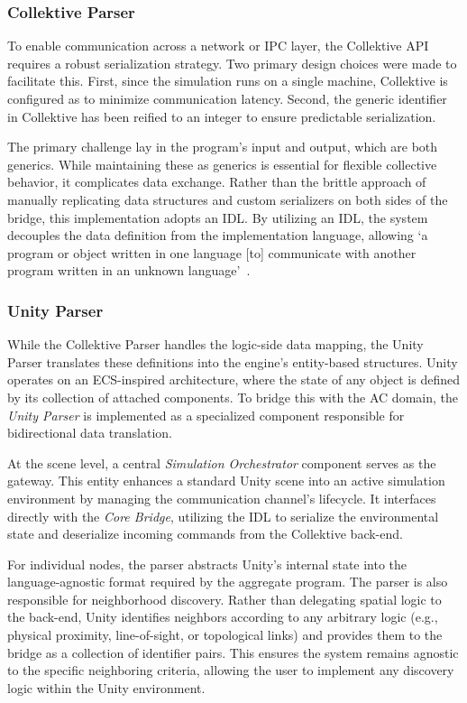 \subsubsection{Collektive Parser}

To enable communication across a network or \ac{IPC} layer, the Collektive \ac{API} requires a robust serialization strategy. Two primary design choices were made to facilitate this. First, since the simulation runs on a single machine, Collektive is configured as  to minimize communication latency. Second, the generic identifier in Collektive has been reified to an integer to ensure predictable serialization.

The primary challenge lay in the program's input and output, which are both generics. While maintaining these as generics is essential for flexible collective behavior, it complicates data exchange. Rather than the brittle approach of manually replicating data structures and custom serializers on both sides of the bridge, this implementation adopts an \ac{IDL}. By utilizing an \ac{IDL}, the system decouples the data definition from the implementation language, allowing `a program or object written in one language [to] communicate with another program written in an unknown language'~\cite{wiki_IDL}.

\subsubsection{Unity Parser}

While the Collektive Parser handles the logic-side data mapping, the Unity Parser translates these definitions into the engine's entity-based structures. Unity operates on an \ac{ECS}-inspired architecture, where the state of any object is defined by its collection of attached components. To bridge this with the \ac{AC} domain, the \textit{Unity Parser} is implemented as a specialized component responsible for bidirectional data translation.

At the scene level, a central \textit{Simulation Orchestrator} component serves as the gateway. This entity enhances a standard Unity scene into an active simulation environment by managing the communication channel's lifecycle. It interfaces directly with the \textit{Core Bridge}, utilizing the \ac{IDL} to serialize the environmental state and deserialize incoming commands from the Collektive back-end.

For individual nodes, the parser abstracts Unity's internal state into the language-agnostic format required by the aggregate program. The parser is also responsible for neighborhood discovery. Rather than delegating spatial logic to the back-end, Unity identifies neighbors according to any arbitrary logic (e.g., physical proximity, line-of-sight, or topological links) and provides them to the bridge as a collection of identifier pairs. This ensures the system remains agnostic to the specific neighboring criteria, allowing the user to implement any discovery logic within the Unity environment.

